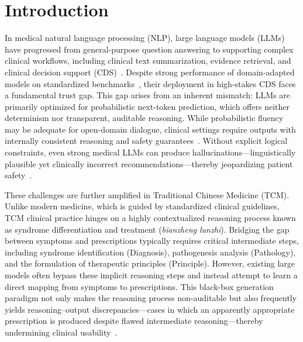 \documentclass[preprint,5p,times,twocolumn,fleqn]{elsarticle}
\begin{document}
\section{Introduction}
\label{introduction}
In medical natural language processing (NLP), large language models (LLMs) have progressed from general-purpose question answering to supporting complex clinical workflows, including clinical text summarization, evidence retrieval, and clinical decision support (CDS)~\citep{li_ehr_scoping_2024,jiang_health_2023}. 
Despite strong performance of domain-adapted models on standardized benchmarks~\citep{azizi_medpalm2_2025,nori_gpt4_medical_2023}, their deployment in high-stakes CDS faces a fundamental trust gap. 
This gap arises from an inherent mismatch: LLMs are primarily optimized for probabilistic next-token prediction, which offers neither determinism nor transparent, auditable reasoning. 
While probabilistic fluency may be adequate for open-domain dialogue, clinical settings require outputs with internally consistent reasoning and safety guarantees~\citep{mesko_regulatory_2023}. 
Without explicit logical constraints, even strong medical LLMs can produce hallucinations---linguistically plausible yet clinically incorrect recommendations---thereby jeopardizing patient safety~\citep{goh_llm_diagnostic_reasoning_2024,pandit_medhallu_2025}.

These challenges are further amplified in Traditional Chinese Medicine (TCM). 
Unlike modern medicine, which is guided by standardized clinical guidelines, TCM clinical practice hinges on a highly contextualized reasoning process known as syndrome differentiation and treatment (\textit{bianzheng lunzhi}). 
Bridging the gap between symptoms and prescriptions typically requires critical intermediate steps, including syndrome identification (Diagnosis), pathogenesis analysis (Pathology), and the formulation of therapeutic principles (Principle). 
However, existing large models often bypass these implicit reasoning steps and instead attempt to learn a direct mapping from symptoms to prescriptions. 
This black-box generation paradigm not only makes the reasoning process non-auditable but also frequently yields reasoning--output discrepancies---cases in which an apparently appropriate prescription is produced despite flawed intermediate reasoning---thereby undermining clinical usability~\citep{huang_tcm-3ceval_2025}.
\end{document}
